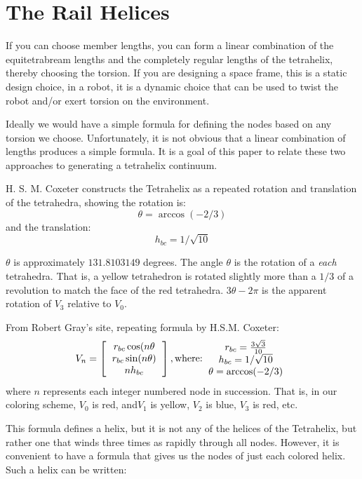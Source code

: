 \documentclass[11pt]{article}
\begin{document}
\section{The Rail Helices}

If you can choose member lengths, you can form a linear combination of the equitetrabream lengths and the completely regular
lengths of the tetrahelix, thereby choosing the torsion.  If you are designing a space frame, this is a static design choice,
in a robot, it is a dynamic choice that can be used to twist the robot and/or exert torsion on the environment.

Ideally we would have a simple formula for defining the nodes based on any torsion we choose.
Unfortunately, it is not obvious that a linear combination of lengths produces a simple formula.
It is a goal of this paper to relate these two approaches to generating a tetrahelix continuum.

H. S. M. Coxeter constructs the Tetrahelix as a repeated rotation and translation of the tetrahedra, showing the
rotation is:
\[
\theta = \arccos(-2/3) 
\]
and the translation:
\[
h_{bc} = 1/\sqrt{10}
\]


$\theta$ is approximately $131.8103149$ degrees.
The angle $\theta$ is the rotation of a \emph{each} tetrahedra.
That is, a yellow tetrahedron is rotated slightly more than a $1/3$ of a revolution to match the face of the red tetrahedra.
$3 \theta - 2\pi$ is the apparent rotation of $V_3$ relative to $V_0$.

From Robert Gray's site, repeating formula by H.S.M. Coxeter:
\[
V_n =
\left [
  \begin{tabular}{c}
   $ r_{bc} \cos(n \theta $\\
   $ r_{bc} \sin(n \theta) $\\
   $ n h_{bc}  $
  \end{tabular}
  \right ],
\text{where:}
  \begin{tabular}{c}
 $ r_{bc} = \frac{3\sqrt{3}}{10} $\\
 $ h_{bc} = 1/\sqrt{10} $ \\
 $ \theta = \arccos(-2/3) $ \\
  \end{tabular}      
\]
where $n$ represents each integer numbered node in succession. That is, in our coloring scheme, $V_0$ is red, and$ V_1$ is yellow,  $V_2$ is blue,
$V_3$ is red, etc. 

This formula defines a helix, but it is not any of the helices of the Tetrahelix, but rather one that winds three times
as rapidly through all nodes. However, it is convenient to have a formula that gives us the nodes of just
each colored helix. Such a helix can be written:
\end{document}
